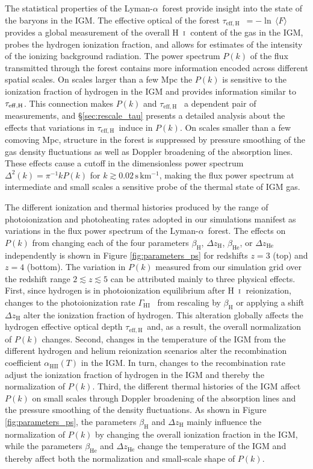 \documentclass[twocolumn]{aastex62}
\newcommand\Lya{Lyman-$\alpha$}
\def\HI{\hbox{\rm H~$\scriptstyle\rm I$}}
\newcommand\GammaHI{$\Gamma_{\mathrm{HI}}$~}
\newcommand\taueffH{$\tau_{\mathrm{eff,H}}$~}
\begin{document}
The statistical properties of the \Lya\ forest provide insight into the state of the baryons in 
the IGM.  The effective optical of the forest \taueffH$= - \ln \, \langle F \rangle$ provides a 
global measurement of the overall \HI\ content of the gas in the IGM,
probes the hydrogen ionization fraction, and allows for estimates of 
the intensity of the ionizing background radiation.
The power spectrum $P(k)$ of the flux transmitted through the forest contains more information encoded across 
different spatial scales. On scales larger than a few 
Mpc the $P(k)$ is sensitive to the ionization fraction of 
hydrogen in the IGM and provides
information similar to $\tau_{\rm eff,H}$.
This connection makes $P(k)$ and \taueffH 
a dependent
pair of measurements, and  
\S\ref{sec:rescale_tau} 
presents a detailed analysis 
about 
the effects that variations in \taueffH induce in $P(k)$.
%
On scales smaller than a few comoving Mpc,
structure in the forest is suppressed by pressure smoothing of the gas density fluctuations 
as well as Doppler broadening of the absorption lines.
These effects cause a cutoff in the dimensionless power spectrum $\Delta^2(k) = \pi^{-1} k P(k)$
for $k \gtrsim 0.02\,\mathrm{s\,km^{-1}}$,
making the flux power spectrum at intermediate and small scales a sensitive probe of the thermal state of IGM gas.

The different ionization and thermal histories produced by the range of photoionization and photoheating 
rates adopted in our simulations
manifest as variations in the flux power spectrum of the \Lya\ forest. The effects on $P(k)$ from changing each of the four parameters 
$\beta_{\mathrm{H}}$, $\Delta z_{\mathrm{H}}$, $\beta_{\mathrm{He}}$, or $\Delta z_{\mathrm{He}}$ independently is shown in Figure \ref{fig:parameters_ps} 
for redshifts $z=3$ (top) and $z=4$ (bottom). 
The variation in $P(k)$ measured from our simulation grid over the redshift range 
$2 \lesssim z \lesssim 5$ 
can be attributed
mainly to three 
physical effects.
First, since hydrogen is in photoionization equilibrium after \HI\ reionization, 
changes to the photoionization rate \GammaHI
from rescaling by $\beta_\mathrm{H}$ or applying a shift
$\Delta z_\mathrm{H}$ alter the ionization fraction of hydrogen. This
alteration globally affects the hydrogen effective optical depth \taueffH and, as a result, the 
overall normalization of $P(k)$ changes. 
Second, changes in the temperature of the IGM from the different hydrogen and helium reionization scenarios
alter the recombination coefficient $\alpha_\mathrm{HII}(T)$ in the IGM. In turn, changes to the recombination
rate adjust the ionization fraction of hydrogen in the IGM and thereby the normalization of $P(k)$.
Third, the different thermal histories of the IGM 
affect $P(k)$ on small scales through Doppler broadening of the absorption lines and the pressure smoothing of the density fluctuations.
As shown in Figure \ref{fig:parameters_ps}, 
the parameters $\beta_\mathrm{H}$ 
and $\Delta z_\mathrm{H}$ mainly 
influence
the normalization of $P(k)$ by changing the overall ionization fraction in the IGM, while the parameters $\beta_\mathrm{He}$ and 
$\Delta z_\mathrm{He}$ change the temperature of the IGM
and thereby affect both the normalization and small-scale shape of $P(k)$.                          
\end{document}
